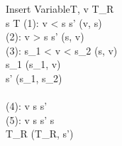 \begin{pseudocode}{Insert Variable}{T, v}
	T_R \GETS \emptyset \\
	\FOREACH {} s  T \DO
		\BEGIN
			\CASE(1): v < s \THEN
				s' \GETS {}(v, s)\\
			\CASE(2): v > s \THEN
				s' \GETS {}(s, v)\\
			\CASE(3): s_1 < v < s_2 \THEN
				\BEGIN
				[s_1, s_2] \GETS {}(s, v)\\
				s_1 \GETS {}(s_1, v)\\
				s' \GETS {}(s_1, s_2)\\
				\END \\
			\CASE(4): \neg v \in s \THEN
				s' \GETS \emptyset \\
			\CASE(5): v \in s \THEN
				s' \GETS s\\
			T_R \GETS {}(T_R, s') \\
		\END \\
\end{pseudocode}